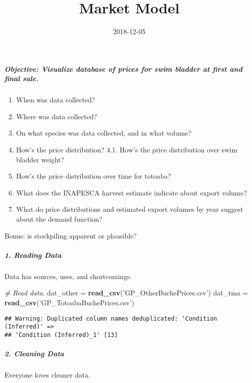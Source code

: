 \documentclass[]{article}
\title{Market Model}
\author{}
\date{2018-12-05}
\newenvironment{Shaded}{\begin{snugshade}}{\end{snugshade}}
\newcommand{\KeywordTok}[1]{\textcolor[rgb]{0.13,0.29,0.53}{\textbf{#1}}}
\newcommand{\StringTok}[1]{\textcolor[rgb]{0.31,0.60,0.02}{#1}}
\newcommand{\CommentTok}[1]{\textcolor[rgb]{0.56,0.35,0.01}{\textit{#1}}}
\newcommand{\NormalTok}[1]{#1}
\providecommand{\tightlist}{%
  \setlength{\itemsep}{0pt}\setlength{\parskip}{0pt}}
\let\oldsubparagraph\subparagraph
\renewcommand{\subparagraph}[1]{\oldsubparagraph{#1}\mbox{}}
\begin{document}
\maketitle

\subparagraph{Objective: Visualize database of prices for swim bladder
at first and final
sale.}\label{objective-visualize-database-of-prices-for-swim-bladder-at-first-and-final-sale.}

\begin{enumerate}
\def\labelenumi{\arabic{enumi}.}
\tightlist
\item
  When was data collected?
\item
  Where was data collected?
\item
  On what species was data collected, and in what volume?
\item
  How's the price distribution? 4.1. How's the price distribution over
  swim bladder weight?
\item
  How's the price distribution over time for totoaba?
\item
  What does the INAPESCA harvest estimate indicate about export volume?
\item
  What do price distributions and estimated export volumes by year
  suggest about the demand function?
\end{enumerate}

Bonus: is stockpiling apparent or plausible?

\subparagraph{1. Reading Data}\label{reading-data}

Data has sources, uses, and shortcomings.

\begin{Shaded}
\begin{Highlighting}[]
\CommentTok{# Read data.}
\NormalTok{dat_other =}\StringTok{ }\KeywordTok{read_csv}\NormalTok{(}\StringTok{'GP_OtherBuchePrices.csv'}\NormalTok{)}
\NormalTok{dat_tma   =}\StringTok{ }\KeywordTok{read_csv}\NormalTok{(}\StringTok{'GP_TotoabaBuchePrices.csv'}\NormalTok{)}
\end{Highlighting}
\end{Shaded}

\begin{verbatim}
## Warning: Duplicated column names deduplicated: 'Condition (Inferred)' =>
## 'Condition (Inferred)_1' [13]
\end{verbatim}

\subparagraph{2. Cleaning Data}\label{cleaning-data}

Everyone loves cleaner data.
\end{document}
